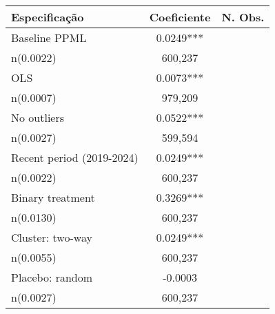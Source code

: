 \begin{tabular}{lcc}
\toprule
Especificação & Coeficiente & N. Obs. \\
\midrule
Baseline PPML & 0.0249***\\n(0.0022) & 600,237 \\
OLS & 0.0073***\\n(0.0007) & 979,209 \\
No outliers & 0.0522***\\n(0.0027) & 599,594 \\
Recent period (2019-2024) & 0.0249***\\n(0.0022) & 600,237 \\
Binary treatment & 0.3269***\\n(0.0130) & 600,237 \\
Cluster: two-way & 0.0249***\\n(0.0055) & 600,237 \\
Placebo: random & -0.0003\\n(0.0027) & 600,237 \\
\bottomrule
\end{tabular}
